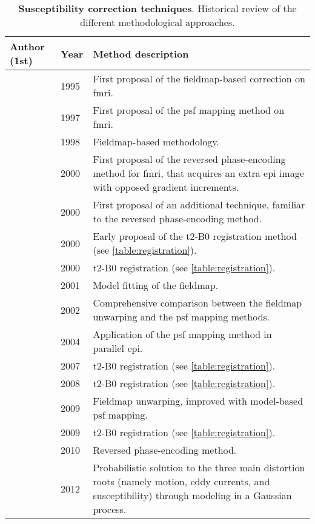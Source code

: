 \begin{table}[h]
	\centering
	\footnotesize
    \begin{tabular}{>{\raggedright}p{}p{}p{}}
    \hline
    Author (1st) & Year & Method description \\ \hline
    \citeauthor{jezzard_correction_1995,jezzard_characterization_1998} & 1995 & First proposal of the fieldmap-based correction on \gls*{fmri}. \\
    \citeauthor{robson_measurement_1997} & 1997 & First proposal of the \gls*{psf} mapping method on
    \gls*{fmri}. \\
    \citeauthor{reber_correction_1998} & 1998 & Fieldmap-based methodology. \\
    \citeauthor{cordes_geometric_2000} & 2000 & First proposal of the reversed phase-encoding method
    for \gls*{fmri}, that acquires an extra \gls*{epi} image with opposed gradient increments. \\
    \citeauthor{chiou_simple_2000} & 2000 & First proposal of an additional technique, familiar to the reversed phase-encoding method. \\
	\citeauthor{kybic_unwarping_2000} & 2000 & Early proposal of the \gls*{t2}-B0 registration method (see \autoref{table:registration}). \\
	\citeauthor{studholme_accurate_2000} & 2000 & \gls*{t2}-B0 registration (see \autoref{table:registration}). \\
	\citeauthor{andersson_modeling_2001} & 2001 & Model fitting of the fieldmap. \\
	\citeauthor{zeng_image_2002} & 2002 & Comprehensive comparison between the fieldmap unwarping and the \gls*{psf} mapping methods. \\
	\citeauthor{zaitsev_point_2004} & 2004 & Application of the \gls*{psf} mapping method in parallel \gls*{epi}. \\
	\citeauthor{li_accounting_2007} & 2007 & \gls*{t2}-B0 registration (see \autoref{table:registration}).  \\
	\citeauthor{wu_comparison_2008} & 2008 & \gls*{t2}-B0 registration (see \autoref{table:registration}).  \\
	\citeauthor{hsu_correction_2009} & 2009 & Fieldmap unwarping, improved with model-based 
	\gls*{psf} mapping. \\
	\citeauthor{tao_variational_2009} & 2009 & \gls*{t2}-B0 registration (see \autoref{table:registration}).  \\
	\citeauthor{holland_efficient_2010} & 2010 & Reversed phase-encoding method. \\
	\citeauthor{andersson_comprehensive_2012} & 2012 & Probabilistic solution to the three main distortion roots (namely motion, eddy currents, and susceptibility) through modeling in a Gaussian process. \\ \hline
    \end{tabular}
    \caption[Susceptibility correction techniques]%
    {\textbf{Susceptibility correction techniques}. Historical review of the different methodological approaches.}
    \label{table:susceptibility}
\end{table}